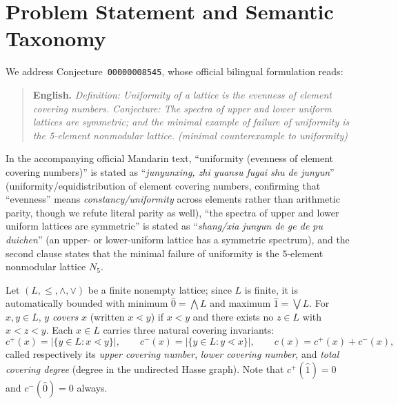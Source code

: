 \documentclass[11pt,a4paper]{article}
\theoremstyle{definition}
\theoremstyle{remark}
\newcommand{\cov}{\lessdot}
\begin{document}
\section{Problem Statement and Semantic Taxonomy}

We address Conjecture~\texttt{00000008545}, whose official bilingual formulation reads:
\begin{quote}
\textbf{English.} \emph{Definition: Uniformity of a lattice is the evenness of element covering numbers. Conjecture: The spectra of upper and lower uniform lattices are symmetric; and the minimal example of failure of uniformity is the 5-element nonmodular lattice. (minimal counterexample to uniformity)}
\end{quote}
In the accompanying official Mandarin text, ``uniformity (evenness of element covering numbers)'' is stated as ``\emph{junyunxing, zhi yuansu fugai shu de junyun}'' (uniformity/equidistribution of element covering numbers, confirming that ``evenness'' means \emph{constancy/uniformity} across elements rather than arithmetic parity, though we refute literal parity as well), ``the spectra of upper and lower uniform lattices are symmetric'' is stated as ``\emph{shang/xia junyun de ge de pu duichen}'' (an upper- or lower-uniform lattice has a symmetric spectrum), and the second clause states that the minimal failure of uniformity is the $5$-element nonmodular lattice $N_5$.

Let $(L, \le, \wedge, \vee)$ be a finite nonempty lattice; since $L$ is finite, it is automatically bounded with minimum $\hat{0} = \bigwedge L$ and maximum $\hat{1} = \bigvee L$. For $x, y \in L$, $y$ \emph{covers} $x$ (written $x \cov y$) if $x < y$ and there exists no $z \in L$ with $x < z < y$. Each $x \in L$ carries three natural covering invariants:
\[
  c^+(x) = |\{y \in L : x \cov y\}|, \qquad
  c^-(x) = |\{y \in L : y \cov x\}|, \qquad
  c(x) = c^+(x) + c^-(x),
\]
called respectively its \emph{upper covering number}, \emph{lower covering number}, and \emph{total covering degree} (degree in the undirected Hasse graph). Note that $c^+(\hat{1}) = 0$ and $c^-(\hat{0}) = 0$ always.
\end{document}
